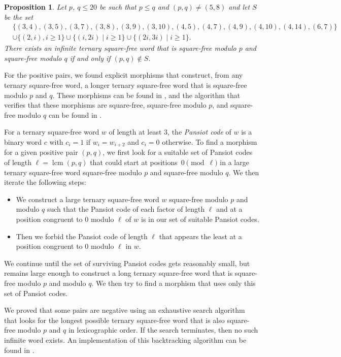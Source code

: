 \documentclass[12pt]{article}
\DeclareMathOperator{\lcm}{lcm}
\newtheorem{proposition}[theorem]{Proposition}
\theoremstyle{definition}
\begin{document}
\begin{proposition}
    Let $p$, $q \le 20$ be such that $p \le q$ and $(p, q) \neq (5,8)$ and let $S$ be the set 
    \begin{align*}
        &\{(3, 4), (3, 5), (3, 7), (3, 8), (3,9), (3,10), (4,5), (4,7), (4,9), (4,10), (4,14), (6,7)\} \\
        &\cup \{(2, i), i \ge 1\} \cup \{(i, 2i) \mid i \ge 1\} \cup \{(2i, 3i) \mid i \ge 1\}.
    \end{align*}
    There exists an infinite ternary square-free word that is square-free modulo $p$ and square-free modulo $q$ if and only if $(p, q) \not\in S$.
\end{proposition}
For the positive pairs, we found explicit morphisms that construct, from any ternary square-free word, a longer ternary square-free word that is square-free modulo $p$ and $q$. These morphisms can be found in \cite[table\_\ref{table:pq_leq_20}\_morphisms.txt]{code}, and the algorithm that verifies that these morphisms are square-free, square-free modulo $p$, and square-free modulo $q$ can be found in \cite[table\_\ref{table:pq_leq_20}\_blue.cpp]{code}.

For a ternary square-free word $w$ of length at least $3$, the \emph{Pansiot code} of $w$ is a binary word $c$ with $c_i = 1$ if $w_i = w_{i + 2}$ and $c_i = 0$ otherwise. To find a morphism for a given positive pair $(p,q)$, we first look for a suitable
set of Pansiot codes of length $\ell=\lcm(p,q)$ that could start at positions~$0\pmod{\ell}$ in a large ternary square-free word square-free modulo $p$ and square-free modulo $q$.
We then iterate the following steps:
\begin{itemize}
    \item We construct a large ternary square-free word $w$ square-free modulo $p$ and modulo $q$ such that the Pansiot code of each factor of length $\ell$ and at a position congruent to $0$ modulo $\ell$ of $w$ is in our set of suitable Pansiot codes.
    \item Then we forbid the Pansiot code of length $\ell$ that appears the least at a position congruent to $0$ modulo $\ell$ in $w$.
\end{itemize}
We continue until the set of surviving Pansiot codes gets reasonably small, but remains large enough to construct a
long ternary square-free word that is square-free modulo $p$ and modulo $q$.
We then try to find a morphism that uses only this set of Pansiot codes.

We proved that some pairs are negative using an exhaustive search algorithm that looks for the longest possible ternary square-free word that is also square-free modulo $p$ and $q$ in lexicographic order. If the search terminates, then no such infinite word exists. An implementation of this backtracking algorithm can be found in
\cite[table\_\ref{table:pq_leq_20}\_red.cpp]{code}. 
\end{document}
